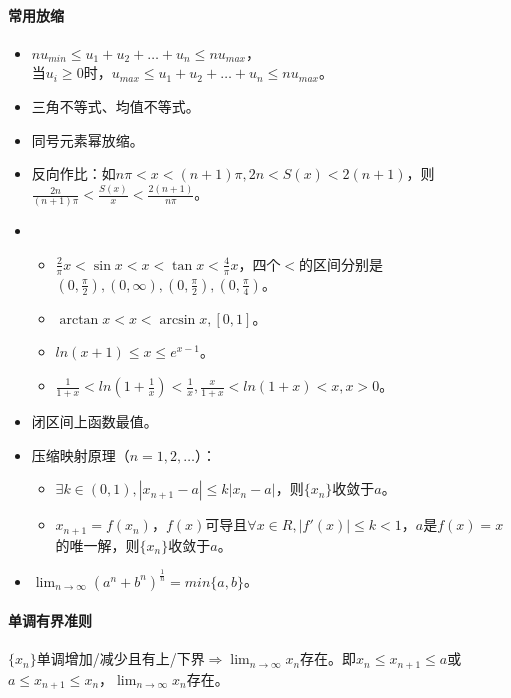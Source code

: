\documentclass[
12pt, %
a4paper, 
oneside, %
headinclude,footinclude, %
]{scrartcl}
\begin{document}
\paragraph{常用放缩}
\begin{itemize}
\item 
$ n u_{min} \leq u_1 + u_2 + \dots +u_n \leq n u_{max} $， \\
当$ u_i \geq  0 $时，$ u_{max} \leq u_1 + u_2 + \dots +u_n \leq n u_{max} $。
\item 三角不等式、均值不等式。
\item 同号元素幂放缩。
\item 反向作比：如$ n \pi < x < (n + 1)\pi, 2n < S(x) < 2(n + 1) $，则$ \frac{2n}{(n + 1)\pi} < \frac{S(x)}{x} < \frac{2(n + 1)}{n \pi} $。
\item 
\begin{itemize}
\item $ \frac{2}{\pi}x < \sin x < x < \tan x < \frac{4}{\pi}x $，四个$ < $的区间分别是$ (0, \frac{\pi}{2}), (0, \infty), (0, \frac{\pi}{2}), (0, \frac{\pi}{4}) $。
\item $ \arctan x < x < \arcsin x, [0, 1] $。
\item $ ln(x + 1) \leq x \leq e^{x - 1} $。
\item $ \frac{1}{1 + x} < ln(1 + \frac{1}{x}) < \frac{1}{x}, \frac{x}{1 + x} < ln(1 + x) < x, x > 0 $。
\end{itemize}
\item 闭区间上函数最值。
\item 压缩映射原理（$ n = 1, 2, \dots $）：
\begin{itemize}
\item $ \exists k \in (0, 1), |x_{n + 1} - a| \leq k|x_n - a| $，则$ \{x_n\} $收敛于$ a $。
\item $ x_{n + 1} = f(x_n) $，$ f(x) $可导且$ \forall x \in R, |f'(x)| \leq k < 1 $，$ a $是$ f(x) = x $的唯一解，则$ \{x_n\} $收敛于$ a $。
\end{itemize}
\item $ \lim_{n \to \infty} (a^n + b^n)^{\frac{1}{n}} = min\{a, b\} $。
\end{itemize}
\paragraph{单调有界准则}
$ \{x_n\} $单调增加/减少且有上/下界$ \Rightarrow $$ \lim_{n \to \infty} x_n $存在。即$ x_n \leq x_{n + 1} \leq a $或$ a \leq x_{n + 1} \leq x_n $，$ \lim_{n \to \infty} x_n $存在。
\end{document}
